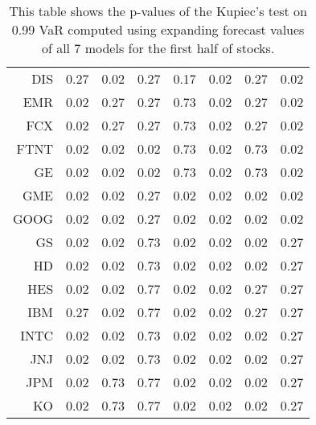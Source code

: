 \begin{table}[ht]
\begin{tabular}{rrrrrrrr}
  DIS & 0.27 & 0.02 & 0.27 & 0.17 & 0.02 & 0.27 & 0.02 \\ 
  EMR & 0.02 & 0.27 & 0.27 & 0.73 & 0.02 & 0.27 & 0.02 \\ 
  FCX & 0.02 & 0.27 & 0.27 & 0.73 & 0.02 & 0.27 & 0.02 \\ 
  FTNT & 0.02 & 0.02 & 0.02 & 0.73 & 0.02 & 0.73 & 0.02 \\ 
  GE & 0.02 & 0.02 & 0.02 & 0.73 & 0.02 & 0.73 & 0.02 \\ 
  GME & 0.02 & 0.02 & 0.27 & 0.02 & 0.02 & 0.02 & 0.02 \\ 
  GOOG & 0.02 & 0.02 & 0.27 & 0.02 & 0.02 & 0.02 & 0.02 \\ 
  GS & 0.02 & 0.02 & 0.73 & 0.02 & 0.02 & 0.02 & 0.27 \\ 
  HD & 0.02 & 0.02 & 0.73 & 0.02 & 0.02 & 0.02 & 0.27 \\ 
  HES & 0.02 & 0.02 & 0.77 & 0.02 & 0.02 & 0.27 & 0.27 \\ 
  IBM & 0.27 & 0.02 & 0.77 & 0.02 & 0.02 & 0.27 & 0.27 \\ 
  INTC & 0.02 & 0.02 & 0.73 & 0.02 & 0.02 & 0.02 & 0.27 \\ 
  JNJ & 0.02 & 0.02 & 0.73 & 0.02 & 0.02 & 0.02 & 0.27 \\ 
  JPM & 0.02 & 0.73 & 0.77 & 0.02 & 0.02 & 0.02 & 0.27 \\ 
  KO & 0.02 & 0.73 & 0.77 & 0.02 & 0.02 & 0.02 & 0.27 \\ 
   \hline
\end{tabular}
\caption[Kupiec's test p-values, alpha =0.99 (1)]{This table shows the p-values of the Kupiec's test on 0.99 VaR computed using expanding forecast values of all 7 models for the first half of stocks.} 
\label{Table:Kupiec_test_expanding_0.99_1}
\end{table}
